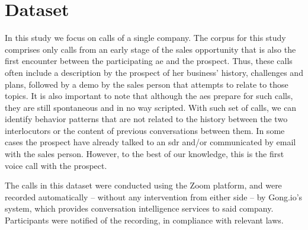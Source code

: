 

\section{Dataset}
\label{sec:dataset}

In this study we focus on calls of a single company.
The corpus for this study comprises only calls from an early stage of the sales opportunity that is also the first encounter between the participating \ac{ae} and the prospect.
Thus, these calls often include a description by the prospect of her business' history, challenges and plans, followed by a demo by the sales person that attempts to relate to those topics.
It is also important to note that although the \acp{ae} prepare for such calls, they are still spontaneous and in no way scripted.
With such set of calls, we can identify behavior patterns that are not related to the history between the two interlocutors or the content of previous conversations between them.
In some cases the prospect have already talked to an \ac{sdr} and/or communicated by email with the sales person.
However, to the best of our knowledge, this is the first voice call with the prospect.

The calls in this dataset were conducted using the Zoom platform, and were recorded automatically -- without any intervention from either side -- by Gong.io's system, which provides conversation intelligence services to said company.
Participants were notified of the recording, in compliance with relevant laws.

